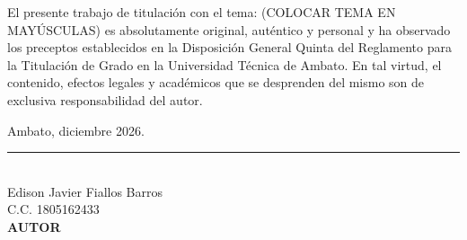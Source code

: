 
El presente trabajo de titulación con el tema: (COLOCAR TEMA EN MAYÚSCULAS) es
absolutamente original, auténtico y personal y ha observado los preceptos establecidos
en la Disposición General Quinta del Reglamento para la Titulación de Grado en la
Universidad Técnica de Ambato. En tal virtud, el contenido, efectos legales y académicos
que se desprenden del mismo son de exclusiva responsabilidad del autor.

\vspace{2em}
\begin{flushright}
    Ambato, diciembre 2026.
\end{flushright}

\vspace{4em}
\begin{center}
    \rule{6cm}{0.4pt}\\[0.2cm]
    Edison Javier Fiallos Barros\\
    C.C. 1805162433\\[0.1cm]
    \textbf{AUTOR}
\end{center}
